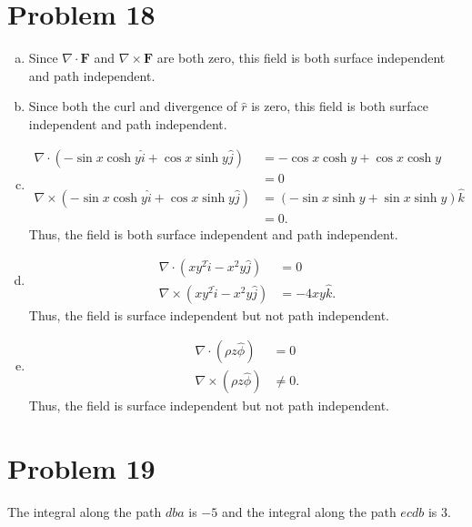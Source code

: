 \documentclass[10pt]{mypackage}
\begin{document}
\section{Problem 18}%
\begin{enumerate}[(a)]
  \item Since $\nabla \cdot \mathbf{F}$ and $\nabla \times \mathbf{F}$ are both zero, this field is both surface independent and path independent.
  \item Since both the curl and divergence of $\hat{r}$ is zero, this field is both surface independent and path independent.
  \item 
    \begin{align*}
      \nabla \cdot \left(-\sin x \cosh y\hat{i} + \cos x \sinh y \hat{j}\right) &= -\cos x \cosh y + \cos x\cosh y\\
                                                                                & = 0\\
      \nabla \times \left(-\sin x \cosh y\hat{i} + \cos x \sinh y \hat{j}\right) &= \left(-\sin x \sinh y + \sin x \sinh y\right)\hat{k}\\
                                                                                 &= 0.
    \end{align*}
    Thus, the field is both surface independent and path independent.
  \item 
    \begin{align*}
      \nabla \cdot \left(xy^2\hat{i} - x^2y\hat{j}\right) &=0\\
      \nabla \times \left(xy^2\hat{i} - x^2y\hat{j}\right) &= -4xy\hat{k}.
    \end{align*}
    Thus, the field is surface independent but not path independent.
  \item 
    \begin{align*}
      \nabla \cdot \left(\rho z \hat{\phi}\right) &= 0\\
      \nabla \times \left(\rho z \hat{\phi}\right) &\neq 0.
    \end{align*}
    Thus, the field is surface independent but not path independent.
\end{enumerate}
\section{Problem 19}%
The integral along the path $dba$ is $-5$ and the integral along the path $ecdb$ is $3$.
\end{document}
